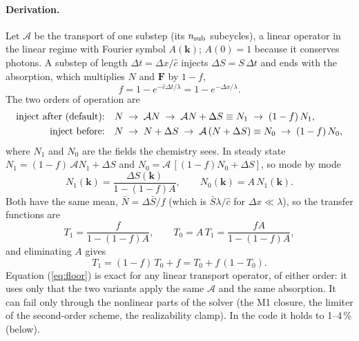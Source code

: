 \documentclass[11pt]{article}
\newcommand{\chat}{\hat{c}}
\newcommand{\dx}{\Delta x}
\begin{document}
\paragraph{Derivation.} Let $\mathcal A$ be the transport of one substep (its $n_{\rm sub}$ subcycles), a
linear operator in the linear regime with Fourier symbol $A(\mathbf k)$; $A(0)=1$ because it conserves photons.
A substep of length $\Delta t=\dx/\chat$ injects $\Delta S=S\,\Delta t$ and ends with the absorption, which
multiplies $N$ and $\mathbf F$ by $1-f$,
\begin{equation}
f=1-e^{-\chat\Delta t/\lambda}=1-e^{-\dx/\lambda}.
\end{equation}
The two orders of operation are
\begin{align}
\hbox{inject after (default):}\quad & N\;\to\;\mathcal AN\;\to\;\mathcal AN+\Delta S\equiv N_1\;\to\;(1-f)\,N_1,\\
\hbox{inject before:}\quad & N\;\to\;N+\Delta S\;\to\;\mathcal A\,(N+\Delta S)\equiv N_0\;\to\;(1-f)\,N_0,
\end{align}
where $N_1$ and $N_0$ are the fields the chemistry sees. In steady state
$N_1=(1-f)\,\mathcal AN_1+\Delta S$ and $N_0=\mathcal A\,[(1-f)N_0+\Delta S]$, so mode by mode
\begin{equation}
N_1(\mathbf k)=\frac{\Delta S(\mathbf k)}{1-(1-f)A},\qquad N_0(\mathbf k)=A\,N_1(\mathbf k).\label{eq:n1n0}
\end{equation}
Both have the same mean, $\bar N=\Delta\bar S/f$ (which is $\bar S\lambda/\chat$ for $\dx\ll\lambda$), so the
transfer functions are
\begin{equation}
T_1=\frac{f}{1-(1-f)A},\qquad T_0=A\,T_1=\frac{fA}{1-(1-f)A},\label{eq:t1t0}
\end{equation}
and eliminating $A$ gives
\begin{equation}
T_1=(1-f)\,T_0+f=T_0+f\,(1-T_0).\label{eq:floor}
\end{equation}
Equation (\ref{eq:floor}) is exact for any linear transport operator, of either order: it uses only that
the two variants apply the same $\mathcal A$ and the same absorption. It can fail only through the nonlinear
parts of the solver (the M1 closure, the limiter of the second-order scheme, the realizability clamp). In the
code it holds to 1--4\,\% (below).
\end{document}
